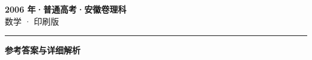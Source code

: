 \documentclass[zihao=5, a4paper]{ctexart}
\begin{document}
\begin{center}
  {\Large\bfseries 2006 年·普通高考·安徽卷理科}\\[4pt]
  {\large 数学 · 印刷版}
\end{center}
\medskip
{}

\par\bigskip\hrule\bigskip
{}
\begin{center}{\large\bfseries 参考答案与详细解析}\end{center}
\smallskip

\end{document}

